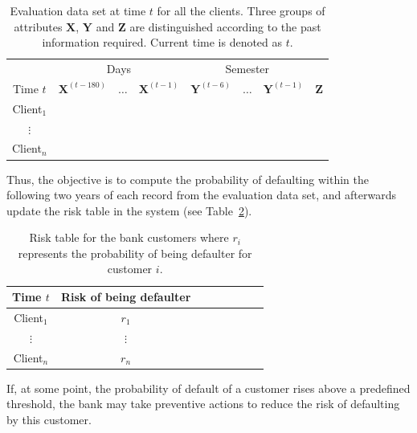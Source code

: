 \documentclass{article}
\theoremstyle{theorem}
\theoremstyle{definition}
\newcommand{\X}{\mathbf{X}}
\newcommand{\Y}{\mathbf{Y}}
\newcommand{\Z}{\mathbf{Z}}
\begin{document}
\begin{itemize}
\begin{table}[ht!]
\centering
\begin{tabular}{c|ccc|ccc|c}
	&\multicolumn{3}{c|}{Days} & \multicolumn{3}{c|}{Semester} \\
     Time $t$              & $\X^{(t-180)}$ & $\ldots$ & $\X^{(t-1)} $ & $\Y^{(t-6)}$  & $\ldots$ & $\Y^{(t-1)} $ & $\Z$  \\  
\hline
Client$_1$  &                                                  &              &                     &                               &                     &        \\ 
$\vdots$      &                                                 &               &                     &                                &                     &      \\ 
Client$_n$  &                                                &               &                     &                                &                     &     \\ 
\end{tabular}
\caption{Evaluation data set at time $t$ for all the clients. Three groups of attributes $\X$, $\Y$ and $\Z$ are distinguished according to the past information required. Current time is denoted as $t$.}
\label{tab:EvaluationDataset} 
\end{table}

Thus, the objective is to compute the probability of defaulting within the following two years of each record from the evaluation data set, and afterwards update the risk table in the system (see Table~\ref{tab:riskTable}).

\begin{table}[ht!]
\centering
\begin{tabular}{c|ccc|ccc|c}
     Time $t$  & Risk of being defaulter \\  
\hline
Client$_1$  &    $r_1$  \\ 
$\vdots$      &   $\vdots$   \\ 
Client$_n$  &   $r_n$  \\ 
\end{tabular} 
\caption{Risk table for the bank customers where $r_i$ represents the probability of being defaulter for customer $i$.}
\label{tab:riskTable}
\end{table}

If, at some point, the probability of default of a customer rises above a predefined threshold, the bank may take preventive actions to reduce the risk of defaulting by this customer.



\end{itemize}
\end{document}
